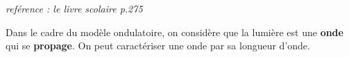 \documentclass[french, a4paper, 12pt]{article}
\begin{document}
\begin{center}
\textit{reférence : le livre scolaire p.275}
\end{center}

Dans le cadre du modèle ondulatoire, on considère que la lumière est une \textbf{onde} qui se \textbf{propage}. On peut caractériser une onde par sa longueur d'onde.


			 
	
		
	
	
\end{document}
